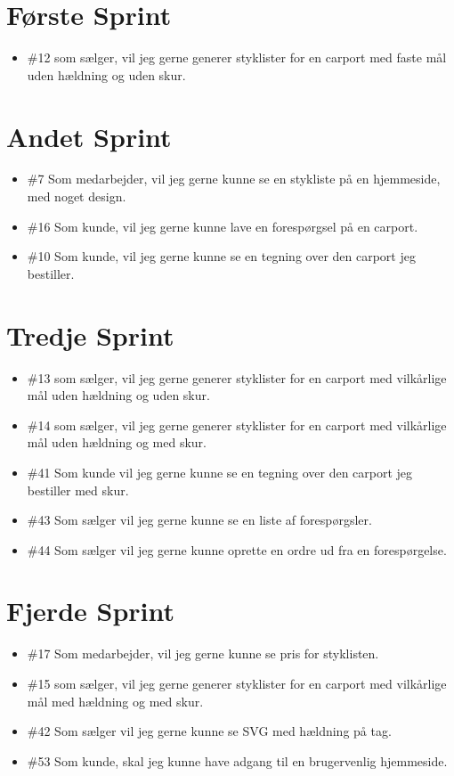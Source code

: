 \documentclass[11pt]{report}
\begin{document}
\section*{Første Sprint}
\begin{itemize}
  \item \#12 som sælger, vil jeg gerne generer styklister for en carport med faste mål uden hældning og uden skur.
\end{itemize}
\section*{Andet Sprint}
\begin{itemize}
  \item \#7 Som medarbejder, vil jeg gerne kunne se en stykliste på en
    hjemmeside, med noget design.
  \item \#16 Som kunde, vil jeg gerne kunne lave en forespørgsel på en carport.
  \item \#10 Som kunde, vil jeg gerne kunne se en tegning over den carport jeg bestiller.
\end{itemize}
\newpage
\section*{Tredje Sprint}
\begin{itemize}
  \item \#13 som sælger, vil jeg gerne generer styklister for en carport med vilkårlige mål uden hældning og uden skur.
  \item \#14 som sælger, vil jeg gerne generer styklister for en carport med vilkårlige mål uden hældning og med skur.
  \item \#41 Som kunde vil jeg gerne kunne se en tegning over den carport jeg bestiller med skur.
  \item \#43 Som sælger vil jeg gerne kunne se en liste af forespørgsler.
  \item \#44 Som sælger vil jeg gerne kunne oprette en ordre ud fra en forespørgelse.
\end{itemize}
\section*{Fjerde Sprint}
\begin{itemize}
  \item \#17 Som medarbejder, vil jeg gerne kunne se pris for styklisten.
  \item \#15 som sælger, vil jeg gerne generer styklister for en carport med vilkårlige mål med hældning og med skur.
  \item \#42 Som sælger vil jeg gerne kunne se SVG med hældning på tag.
  \item \#53 Som kunde, skal jeg kunne have adgang til en brugervenlig hjemmeside.
\end{itemize}
\newpage
\end{document}

